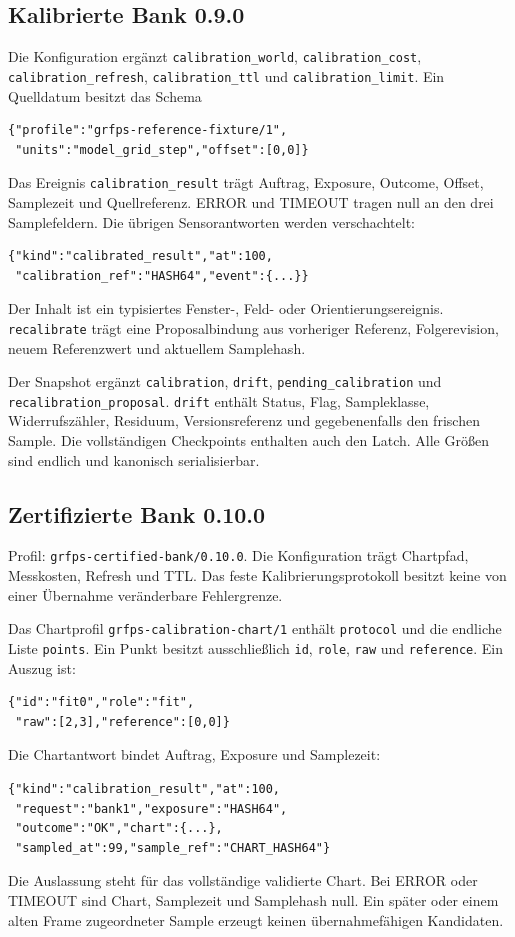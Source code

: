 \documentclass[11pt,a4paper]{article}
\begin{document}
\clearpage\subsection{Kalibrierte Bank 0.9.0}
Die Konfiguration ergänzt \texttt{calibration\_world},
\texttt{calibration\_cost}, \texttt{calibration\_refresh},
\texttt{calibration\_ttl} und \texttt{calibration\_limit}.
Ein Quelldatum besitzt das Schema
\begin{lstlisting}
{"profile":"grfps-reference-fixture/1",
 "units":"model_grid_step","offset":[0,0]}
\end{lstlisting}
Das Ereignis \texttt{calibration\_result} trägt Auftrag,
Exposure, Outcome, Offset, Samplezeit und Quellreferenz.
ERROR und TIMEOUT tragen null an den drei Samplefeldern.
Die übrigen Sensorantworten werden verschachtelt:
\begin{lstlisting}
{"kind":"calibrated_result","at":100,
 "calibration_ref":"HASH64","event":{...}}
\end{lstlisting}
Der Inhalt ist ein typisiertes Fenster-, Feld- oder
Orientierungsereignis. \texttt{recalibrate} trägt eine
Proposalbindung aus vorheriger Referenz, Folgerevision,
neuem Referenzwert und aktuellem Samplehash.

Der Snapshot ergänzt \texttt{calibration}, \texttt{drift},
\texttt{pending\_calibration} und
\texttt{recalibration\_proposal}. \texttt{drift} enthält
Status, Flag, Sampleklasse, Widerrufszähler, Residuum,
Versionsreferenz und gegebenenfalls den frischen Sample.
Die vollständigen Checkpoints enthalten auch den Latch.
Alle Größen sind endlich und kanonisch serialisierbar.

\clearpage\subsection{Zertifizierte Bank 0.10.0}
Profil: \texttt{grfps-certified-bank/0.10.0}. Die Konfiguration
trägt Chartpfad, Messkosten, Refresh und TTL. Das feste
Kalibrierungsprotokoll besitzt keine von einer Übernahme
veränderbare Fehlergrenze.

Das Chartprofil \texttt{grfps-calibration-chart/1} enthält
\texttt{protocol} und die endliche Liste \texttt{points}.
Ein Punkt besitzt ausschließlich \texttt{id}, \texttt{role},
\texttt{raw} und \texttt{reference}. Ein Auszug ist:
\begin{lstlisting}
{"id":"fit0","role":"fit",
 "raw":[2,3],"reference":[0,0]}
\end{lstlisting}
Die Chartantwort bindet Auftrag, Exposure und Samplezeit:
\begin{lstlisting}
{"kind":"calibration_result","at":100,
 "request":"bank1","exposure":"HASH64",
 "outcome":"OK","chart":{...},
 "sampled_at":99,"sample_ref":"CHART_HASH64"}
\end{lstlisting}
Die Auslassung steht für das vollständige validierte Chart.
Bei ERROR oder TIMEOUT sind Chart, Samplezeit und Samplehash null.
Ein später oder einem alten Frame zugeordneter Sample erzeugt
keinen übernahmefähigen Kandidaten.
\end{document}
